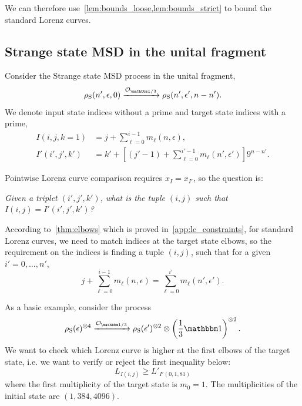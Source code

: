\documentclass[pra,
aps,
twocolumn,
superscriptaddress,
groupedaddress,
nofootinbib,
reprint
]{revtex4-1}
\begin{document}
We can therefore use~\cref{lem:bounds_loose,lem:bounds_strict} to bound the standard Lorenz curves.



\subsection{Strange state MSD in the unital fragment}\label{app:lc_compare}

Consider the Strange state MSD process in the unital fragment,
\begin{equation}\label{eq:su_conversion}
    \rho_{\rm{S}}(n', \epsilon, 0) \xrightarrow{\mathcal{O}_{\id/3}} \rho_{\rm{S}}(n', \epsilon', n-n').
\end{equation}
We denote input state indices without a prime and target state indices with a prime,
\begin{align}
    I(i,j,k=1) &= j + \sum_{\ell=0}^{i-1} m_{\ell}(n, \epsilon), \\
    I'(i',j',k') &= k' + \left[ (j'-1) + \sum_{\ell=0}^{i'-1} m_{\ell}(n', \epsilon') \right]9^{n-n'}.
\end{align}

Pointwise Lorenz curve comparison requires $x_{I} = x_{I'}$, so the question is: 
\begin{center}
\emph{Given a triplet $(i',j',k')$, what is the tuple $(i,j)$ such that $I(i,j) = I'(i',j',k')$?}
\end{center}

According to~\cref{thm:elbows} which is proved in~\cref{app:lc_constraints}, for standard Lorenz curves, we need to match indices at the target state elbows, so the requirement on the indices is finding a tuple $(i, j)$, such that for a given $i' = 0,\dots,n'$,
\begin{equation}
	j + \sum_{\ell=0}^{i-1} m_{\ell}(n, \epsilon) = \sum_{\ell=0}^{i'} m_{\ell}(n', \epsilon').
\end{equation}

As a basic example, consider the process 
\begin{equation}
\rho_{\rm{S}}(\epsilon)^{\otimes 4} \xrightarrow{\mathcal{O}_{\id/3}} \rho_{\rm{S}}(\epsilon')^{\otimes 2} \otimes \left( \frac{1}{3}\id \right)^{\otimes 2}.
\end{equation}
We want to check which Lorenz curve is higher at the first elbows of the target state, i.e. we want to verify or reject the first inequality below:
\begin{equation}
	L_{I(i,j)} \geq L'_{I'(0, 1, 81)}
\end{equation}
where the first multiplicity of the target state is $m_0 = 1$.
The multiplicities of the initial state are $(1, 384, 4096)$.
\end{document}
